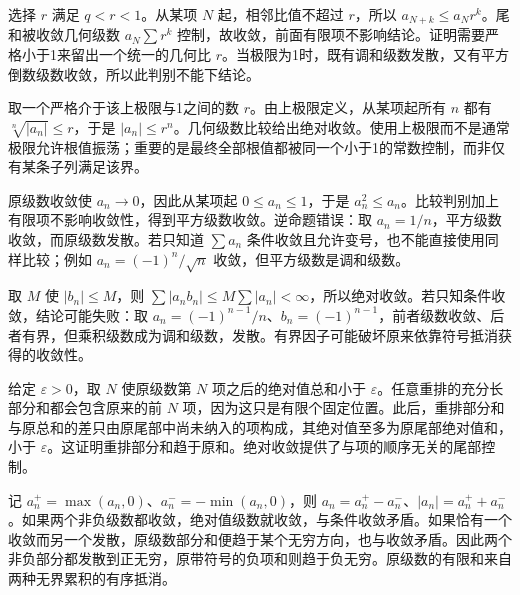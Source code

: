 \documentclass[12pt,fontset=fandol]{ctexart}
\begin{document}
\begin{solve}\label{ans:c29q5}
选择 $r$ 满足 $q<r<1$。从某项 $N$ 起，相邻比值不超过 $r$，所以 $a_{N+k}\le a_Nr^k$。尾和被收敛几何级数 $a_N\sum r^k$ 控制，故收敛，前面有限项不影响结论。证明需要严格小于1来留出一个统一的几何比 $r$。当极限为1时，既有调和级数发散，又有平方倒数级数收敛，所以此判别不能下结论。
\end{solve}

\begin{solve}\label{ans:c29q6}
取一个严格介于该上极限与1之间的数 $r$。由上极限定义，从某项起所有 $n$ 都有 $\sqrt[n]{|a_n|}\le r$，于是 $|a_n|\le r^n$。几何级数比较给出绝对收敛。使用上极限而不是通常极限允许根值振荡；重要的是最终全部根值都被同一个小于1的常数控制，而非仅有某条子列满足该界。
\end{solve}

\begin{solve}\label{ans:c29q7}
原级数收敛使 $a_n\to0$，因此从某项起 $0\le a_n\le1$，于是 $a_n^2\le a_n$。比较判别加上有限项不影响收敛性，得到平方级数收敛。逆命题错误：取 $a_n=1/n$，平方级数收敛，而原级数发散。若只知道 $\sum a_n$ 条件收敛且允许变号，也不能直接使用同样比较；例如 $a_n=(-1)^n/\sqrt n$ 收敛，但平方级数是调和级数。
\end{solve}

\begin{solve}\label{ans:c29q8}
取 $M$ 使 $|b_n|\le M$，则 $\sum|a_nb_n|\le M\sum|a_n|<\infty$，所以绝对收敛。若只知条件收敛，结论可能失败：取 $a_n=(-1)^{n-1}/n$、$b_n=(-1)^{n-1}$，前者级数收敛、后者有界，但乘积级数成为调和级数，发散。有界因子可能破坏原来依靠符号抵消获得的收敛性。
\end{solve}

\begin{solve}\label{ans:c29q9}
给定 $\varepsilon>0$，取 $N$ 使原级数第 $N$ 项之后的绝对值总和小于 $\varepsilon$。任意重排的充分长部分和都会包含原来的前 $N$ 项，因为这只是有限个固定位置。此后，重排部分和与原总和的差只由原尾部中尚未纳入的项构成，其绝对值至多为原尾部绝对值和，小于 $\varepsilon$。这证明重排部分和趋于原和。绝对收敛提供了与项的顺序无关的尾部控制。
\end{solve}

\begin{solve}\label{ans:c29q10}
记 $a_n^+=\max(a_n,0)$、$a_n^-=-\min(a_n,0)$，则 $a_n=a_n^+-a_n^-$、$|a_n|=a_n^++a_n^-$。如果两个非负级数都收敛，绝对值级数就收敛，与条件收敛矛盾。如果恰有一个收敛而另一个发散，原级数部分和便趋于某个无穷方向，也与收敛矛盾。因此两个非负部分都发散到正无穷，原带符号的负项和则趋于负无穷。原级数的有限和来自两种无界累积的有序抵消。
\end{solve}
\end{document}
